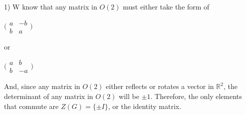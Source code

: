 \documentclass[executivepaper]{article}
\begin{document}
\begin{flushleft}

1) W know that any matrix in $O(2)$ must either take the form of

\begin{center}

$\bigl(\begin{smallmatrix}
a&-b \\ b&a
\end{smallmatrix} \bigr)$

\end{center}

or

\begin{center}

$\bigl(\begin{smallmatrix}
a&b \\ b&-a
\end{smallmatrix} \bigr)$

\end{center}

And, since any matrix in $O(2)$ either reflects or rotates a vector in $\mathbb{R}^2$, the determinant of any matrix in $O(2)$ will be $\pm 1$. Therefore, the only elements that commute are $Z(G)=\{ \pm I \}$, or the identity matrix. 

\end{flushleft}
\end{document}
